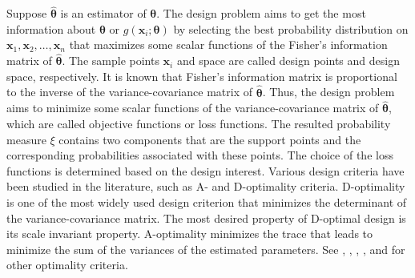 \documentclass[
]{book}
\theoremstyle{definition}
\theoremstyle{definition}
\theoremstyle{definition}
\theoremstyle{definition}
\theoremstyle{remark}
\begin{document}
Suppose \(\hat{\boldsymbol{\theta}}\) is an estimator of \(\boldsymbol{\theta}\). The design problem aims to get the most information about \(\boldsymbol{\theta}\) or \(g\left(\boldsymbol{x}_i;\boldsymbol{\theta}\right)\) by selecting the best probability distribution on \(\boldsymbol{x}_1,\boldsymbol{x}_2,\dots,\boldsymbol{x}_n\) that maximizes some scalar functions of the Fisher's information matrix of \(\hat{\boldsymbol{\theta}}\). The sample points \(\boldsymbol{x}_i\) and space are called design points and design space, respectively. It is known that Fisher's information matrix is proportional to the inverse of the variance-covariance matrix of \(\hat{\boldsymbol{\theta}}\). Thus, the design problem aims to minimize some scalar functions of the variance-covariance matrix of \(\hat{\boldsymbol{\theta}}\), which are called objective functions or loss functions. The resulted probability measure \(\xi\) contains two components that are the support points and the corresponding probabilities associated with these points. The choice of the loss functions is determined based on the design interest. Various design criteria have been studied in the literature, such as A- and D-optimality criteria. D-optimality is one of the most widely used design criterion that minimizes the determinant of the variance-covariance matrix. The most desired property of D-optimal design is its scale invariant property. A-optimality minimizes the trace that leads to minimize the sum of the variances of the estimated parameters. See \citet{fedorov1972theory}, \citet{silvey1980optimal}, \citet{pukelsheim2006optimal}, \citet{berger2009introduction}, and \citet{dean2015handbook} for other optimality criteria.
\end{document}
